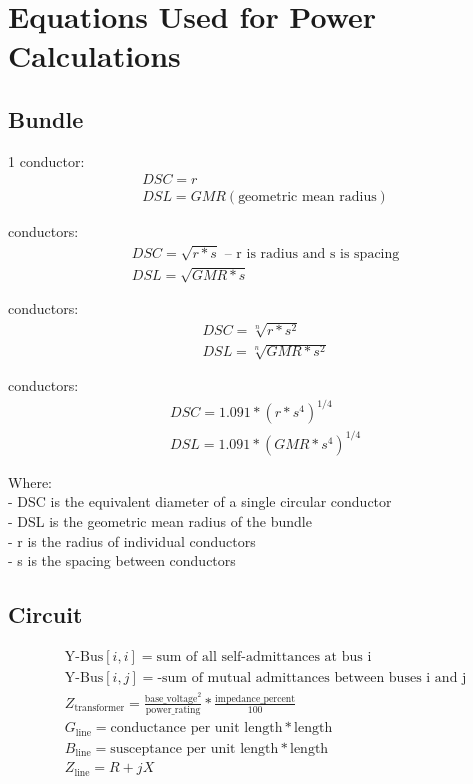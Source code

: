 \documentclass{article}
\begin{document}
	\section{Equations Used for Power Calculations}
	
	\subsection*{Bundle}
	1 conductor: \\
	\begin{align*}
		& DSC = r \\
		& DSL = GMR (\text{geometric mean radius})
	\end{align*}
	
	 conductors: \\
	\begin{align*}
		& DSC = \sqrt{r * s} \text{ -- r is radius and s is spacing} \\
		& DSL = \sqrt{GMR * s}
	\end{align*}
	
	 conductors: \\
	\begin{align*}
		& DSC = \sqrt[n]{r * s^2} \\
		& DSL = \sqrt[n]{GMR * s^2}
	\end{align*}
	
	 conductors: \\
	\begin{align*}
		& DSC = 1.091 * (r * s^4)^{1/4} \\
		& DSL = 1.091 * (GMR * s^4)^{1/4}
	\end{align*}
	
	\noindent
	Where: \\
	- DSC is the equivalent diameter of a single circular conductor \\
	- DSL is the geometric mean radius of the bundle \\
	- r is the radius of individual conductors \\
	- s is the spacing between conductors 
	
	\subsection*{Circuit}
	
	\begin{align*}
		& \text{Y-Bus}[i,i] = \text{sum of all self-admittances at bus i} \\
		& \text{Y-Bus}[i,j] = \text{-sum of mutual admittances between buses i and j} \\
		& Z_{\text{transformer}} = \frac{\text{base\_voltage}^2}{\text{power\_rating}} * \frac{\text{impedance\_percent}}{100} \\
		& G_{\text{line}} = \text{conductance per unit length} * \text{length} \\
		& B_{\text{line}} = \text{susceptance per unit length} * \text{length} \\
		& Z_{\text{line}} = R + jX
	\end{align*}
	
\end{document}
